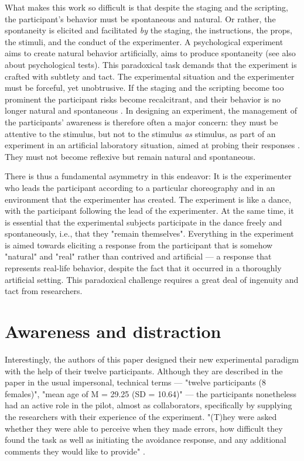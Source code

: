 \documentclass[twocolumn, serif, authordate, reflection]{jote-article}
\begin{document}
What makes this work so difficult is that despite the staging and the scripting, the participant's behavior must be spontaneous and natural. Or rather, the spontaneity is elicited and facilitated \emph{by} the staging, the instructions, the props, the stimuli, and the conduct of the experimenter. A psychological experiment aims to create natural behavior artificially, aims to produce spontaneity (see also \textcite{Derksen2001} about psychological tests). This paradoxical task demands that the experiment is crafted with subtlety and tact. The experimental situation and the experimenter must be forceful, yet unobtrusive. If the staging and the scripting become too prominent the participant risks become recalcitrant, and their behavior is no longer natural and spontaneous \parencite{Derksen2017, Lezaun2007}. In designing an experiment, the management of the participants' awareness is therefore often a major concern: they must be attentive to the stimulus, but not to the stimulus \emph{as} stimulus, as part of an experiment in an artificial laboratory situation, aimed at probing their responses \parencite{Abma2020}. They must not become reflexive but remain natural and spontaneous.

There is thus a fundamental asymmetry in this endeavor: It is the experimenter who leads the participant according to a particular choreography and in an environment that the experimenter has created. The experiment is like a dance, with the participant following the lead of the experimenter. At the same time, it is essential that the experimental subjects participate in the dance freely and spontaneously, i.e., that they "remain themselves". Everything in the experiment is aimed towards eliciting a response from the participant that is somehow "natural" and "real" rather than contrived and artificial — a response that represents real-life behavior, despite the fact that it occurred in a thoroughly artificial setting. This paradoxical challenge requires a great deal of ingenuity and tact from researchers.


  {}\section*{Awareness and distraction} 

Interestingly, the authors of this paper designed their new experimental paradigm with the help of their twelve participants. Although they are described in the paper in the usual impersonal, technical terms — "twelve participants (8 females)", "mean age of M = 29.25 (SD = 10.64)" \parencite[ p.29]{Traxler2020} — the participants nonetheless had an active role in the pilot, almost as collaborators, specifically by supplying the researchers with their experience of the experiment. "(T)hey were asked whether they were able to perceive when they made errors, how difficult they found the task as well as initiating the avoidance response, and any additional comments they would like to provide" \parencite[p.29]{Traxler2020}.
\end{document}
